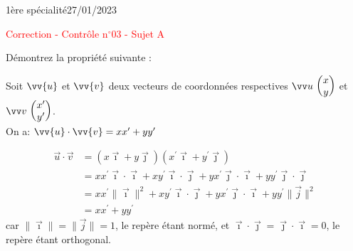 \documentclass[a4paper,12pt]{article}        %
\begin{document}
\graphicspath{{../images/}}
\pagestyle{empty}
\vspace*{-1.5cm}
1ère spécialité\phantom{xxxxxxxxxxxxxxxxxxxxxxxxxxxxxxxxxxxxxxxxxxxxxxxxxxxxxxxxxxxxxxx}27/01/2023
{\begin{center}\Huge{\textcolor{red}{Correction - Contrôle n$^{\circ}$03 - Sujet A}}\end{center}}


Démontrez la propriété suivante :
\begin{propriete}
	Soit $\vv{u}$ et $\vv{v}$ deux vecteurs de coordonnées respectives $\Coord{u}{x}{y}$ et $\Coord{v}{x'}{y'}$.\\
	On a: $\vv{u} \cdot \vv{v}=x x^{\prime}+y y^{\prime}$
\end{propriete}

\begin{corrBox}
	\begin{align*}
		\vec{u} \cdot \vec{v}&=(x \vec{\imath}+y \vec{\jmath})\left(x^{\prime} \vec{\imath}+y^{\prime} \vec{\jmath}\right)\\
		&=x x^{\prime} \vec{\imath} \cdot \vec{\imath}+x y^{\prime} \vec{\imath} \cdot \vec{\jmath}+y x^{\prime} \vec{\jmath} \cdot \vec{\imath}+y y^{\prime} \vec{\jmath} \cdot \vec{\jmath}\\
		&=x x^{\prime}\|\vec{\imath}\|^{2}+x y^{\prime} \vec{\imath} \cdot \vec{\jmath}+y x^{\prime} \vec{\jmath} \cdot \vec{\imath}+y y^{\prime}\|\vec{j}\|^{2}\\
		&=x x^{\prime}+y y^{\prime}
	\end{align*}
	car $\|\vec{\imath}\|=\|\vec{j}\|=1$, le repère étant normé, et $\vec{\imath} \cdot \vec{\jmath}=\vec{\jmath} \cdot \vec{\imath}=0$, le repère étant orthogonal.
\end{corrBox}
\end{document}
